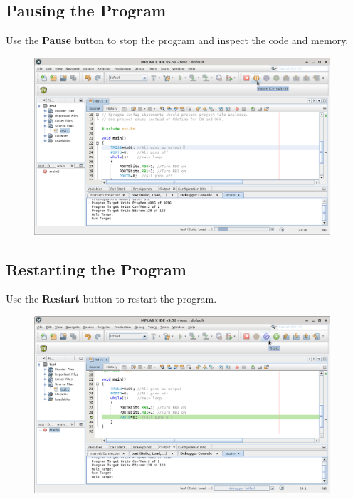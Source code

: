 \subsection{Pausing the Program}
Use the \textbf{Pause} button to stop the program and inspect the code and memory.
\begin{figure}[H]
\center
\includegraphics[width=0.98\textwidth]{img/hmd/mplab26.png} 
\end{figure} 

\subsection{Restarting the Program}
Use the \textbf{Restart} button to restart the program.
\begin{figure}[H]
\center
\includegraphics[width=0.98\textwidth]{img/hmd/mplab27.png} 
\end{figure} 

